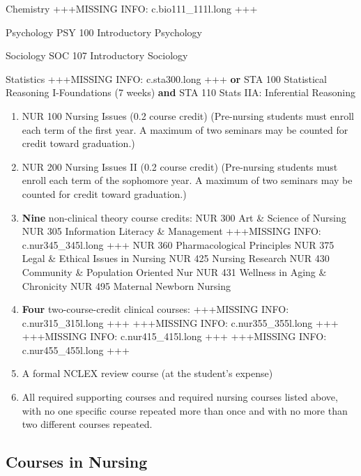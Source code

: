 \documentclass[
  letterpaper,
]{scrbook}
\begin{document}
Chemistry +++MISSING INFO: c.bio111\_111l.long +++

Psychology PSY 100 Introductory Psychology

Sociology SOC 107 Introductory Sociology

Statistics +++MISSING INFO: c.sta300.long +++ \textbf{or} STA 100
Statistical Reasoning I-Foundations (7 weeks) \textbf{and} STA 110 Stats
IIA: Inferential Reasoning

\begin{enumerate}
\def\labelenumi{\arabic{enumi}.}
\setcounter{enumi}{2}
\item
  NUR 100 Nursing Issues (0.2 course credit) (Pre-nursing students must
  enroll each term of the first year. A maximum of two seminars may be
  counted for credit toward graduation.)
\item
  NUR 200 Nursing Issues II (0.2 course credit) (Pre-nursing students
  must enroll each term of the sophomore year. A maximum of two seminars
  may be counted for credit toward graduation.)
\item
  \textbf{Nine} non-clinical theory course credits: NUR 300 Art \&
  Science of Nursing NUR 305 Information Literacy \& Management
  +++MISSING INFO: c.nur345\_345l.long +++ NUR 360 Pharmacological
  Principles NUR 375 Legal \& Ethical Issues in Nursing NUR 425 Nursing
  Research NUR 430 Community \& Population Oriented Nur NUR 431 Wellness
  in Aging \& Chronicity NUR 495 Maternal Newborn Nursing
\item
  \textbf{Four} two-course-credit clinical courses: +++MISSING INFO:
  c.nur315\_315l.long +++ +++MISSING INFO: c.nur355\_355l.long +++
  +++MISSING INFO: c.nur415\_415l.long +++ +++MISSING INFO:
  c.nur455\_455l.long +++
\item
  A formal NCLEX review course (at the student's expense)
\item
  All required supporting courses and required nursing courses listed
  above, with no one specific course repeated more than once and with no
  more than two different courses repeated.
\end{enumerate}

\hypertarget{courses-in-nursing}{%
\subsection{Courses in Nursing}\label{courses-in-nursing}}
\end{document}
